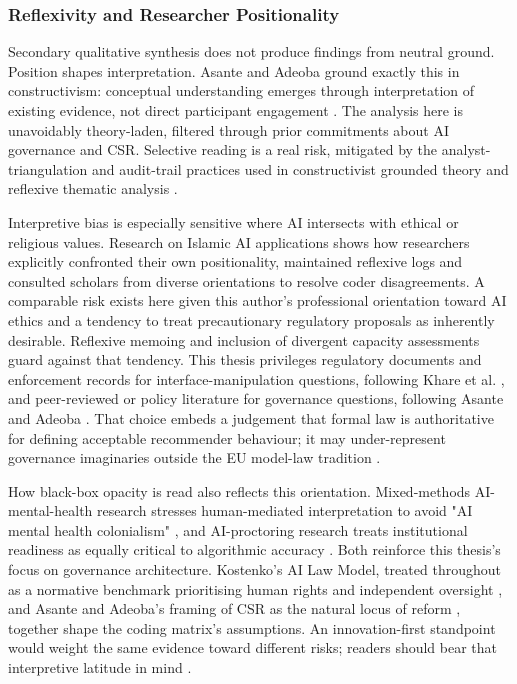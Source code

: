 \documentclass[11pt]{article}
\begin{document}
\subsubsection{Reflexivity and Researcher Positionality}
\label{sec:reflexivity_positionality} Secondary qualitative synthesis does not produce findings from neutral ground. Position shapes interpretation. Asante and Adeoba ground exactly this in constructivism: conceptual understanding emerges through interpretation of existing evidence, not direct participant engagement \parencites[8]{8200246}[10]{8200246}. The analysis here is unavoidably theory-laden, filtered through prior commitments about AI governance and CSR. Selective reading is a real risk, mitigated by the analyst-triangulation and audit-trail practices used in constructivist grounded theory and reflexive thematic analysis \parencites[6]{4245543}[10]{8200246}[11]{8200246}.

Interpretive bias is especially sensitive where AI intersects with ethical or religious values. Research on Islamic AI applications \parencites[5]{0140790} shows how researchers explicitly confronted their own positionality, maintained reflexive logs and consulted scholars from diverse orientations to resolve coder disagreements. A comparable risk exists here given this author's professional orientation toward AI ethics and a tendency to treat precautionary regulatory proposals as inherently desirable. Reflexive memoing and inclusion of divergent capacity assessments \parencites[19]{5162643}[10]{9360054} guard against that tendency. This thesis privileges regulatory documents and enforcement records for interface-manipulation questions, following Khare et al. \parencites[6]{6295677}, and peer-reviewed or policy literature for governance questions, following Asante and Adeoba \parencites[8]{8200246}. That choice embeds a judgement that formal law is authoritative for defining acceptable recommender behaviour; it may under-represent governance imaginaries outside the EU model-law tradition \parencites[12]{6502223}[22]{2977039}.

How black-box opacity is read also reflects this orientation. Mixed-methods AI-mental-health research stresses human-mediated interpretation to avoid "AI mental health colonialism" \parencites[11]{5419804}, and AI-proctoring research treats institutional readiness as equally critical to algorithmic accuracy \parencites[9]{2055956}. Both reinforce this thesis's focus on governance architecture. Kostenko's AI Law Model, treated throughout as a normative benchmark prioritising human rights and independent oversight \parencites[22]{2977039}[37]{2977039}[44]{2977039}, and Asante and Adeoba's framing of CSR as the natural locus of reform \parencites[11]{8200246}, together shape the coding matrix's assumptions. An innovation-first standpoint would weight the same evidence toward different risks; readers should bear that interpretive latitude in mind \parencites[2]{0375818}[7]{7461574}.
\end{document}
